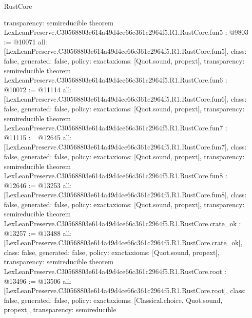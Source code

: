 \begin{lexlean}{RustCore}
\begin{coremodule}
{  transparency: semireducible
}
theorem LexLeanPreserve.C30568803e614a49d4ce66c361c2964f5.R1.RustCore.fun5 : @9803 := @10071 {
  all: [LexLeanPreserve.C30568803e614a49d4ce66c361c2964f5.R1.RustCore.fun5],
  class: false,
  generated: false,
  policy: exact{axioms: [Quot.sound, propext]},
  transparency: semireducible
}
theorem LexLeanPreserve.C30568803e614a49d4ce66c361c2964f5.R1.RustCore.fun6 : @10072 := @11114 {
  all: [LexLeanPreserve.C30568803e614a49d4ce66c361c2964f5.R1.RustCore.fun6],
  class: false,
  generated: false,
  policy: exact{axioms: [Quot.sound, propext]},
  transparency: semireducible
}
theorem LexLeanPreserve.C30568803e614a49d4ce66c361c2964f5.R1.RustCore.fun7 : @11115 := @12645 {
  all: [LexLeanPreserve.C30568803e614a49d4ce66c361c2964f5.R1.RustCore.fun7],
  class: false,
  generated: false,
  policy: exact{axioms: [Quot.sound, propext]},
  transparency: semireducible
}
theorem LexLeanPreserve.C30568803e614a49d4ce66c361c2964f5.R1.RustCore.fun8 : @12646 := @13253 {
  all: [LexLeanPreserve.C30568803e614a49d4ce66c361c2964f5.R1.RustCore.fun8],
  class: false,
  generated: false,
  policy: exact{axioms: [Quot.sound, propext]},
  transparency: semireducible
}
theorem LexLeanPreserve.C30568803e614a49d4ce66c361c2964f5.R1.RustCore.crate_ok : @13257 := @13488 {
  all: [LexLeanPreserve.C30568803e614a49d4ce66c361c2964f5.R1.RustCore.crate_ok],
  class: false,
  generated: false,
  policy: exact{axioms: [Quot.sound, propext]},
  transparency: semireducible
}
theorem LexLeanPreserve.C30568803e614a49d4ce66c361c2964f5.R1.RustCore.root : @13496 := @13506 {
  all: [LexLeanPreserve.C30568803e614a49d4ce66c361c2964f5.R1.RustCore.root],
  class: false,
  generated: false,
  policy: exact{axioms: [Classical.choice, Quot.sound, propext]},
  transparency: semireducible
}


\end{coremodule}
\end{lexlean}
